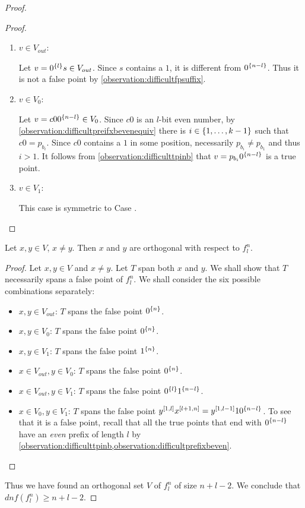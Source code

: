 \begin{proof}
\begin{proof}
\begin{enumerate}
\item $v \in V_{out}$:

Let $v = 0^{\{l\}} s \in V_{out}$.
Since $s$ contains a $1$,
it is different from $0^{\{n-l\}}$.
Thus it is not a false point
by \cref{observation:difficultfpsuffix}.

\item $v \in V_0$:
\label{item:difficultv0}

Let $v = c 0 0^{\{n-l\}} \in V_0$.
Since $c 0$ is an $l$-bit even number,
by \cref{observation:difficultpreifxbevenequiv}
there is $i \in \{1, \ldots, k-1\}$
such that $c 0 = p_{b_i}$.
Since $c0$ contains a $1$ in some position,
necessarily $p_{b_i} \neq p_{b_1}$ and thus $i > 1$.
It follows from \cref{observation:difficulttpinb}
that $v = p_{b_i} 0^{\{n-l\}}$ is a true point.

\item $v \in V_1$:

This case is symmetric to
Case .
\end{enumerate}
\end{proof}

\begin{claim}
Let $x, y \in V$, $x \neq y$.
Then $x$ and $y$ are orthogonal with respect to $f_l^n$.
\end{claim}

\begin{proof}
Let $x,y \in V$ and $x \neq y$.
Let $T$ span both $x$ and $y$.
We shall show that $T$ necessarily spans
a false point of $f_l^n$.
We shall consider the six possible combinations
separately:
\begin{itemize}
\item $x,y \in V_{out}$:
$T$ spans the false point $0^{\{n\}}$.
\item $x,y \in V_0$:
$T$ spans the false point $0^{\{n\}}$.
\item $x,y \in V_1$:
$T$ spans the false point $1^{\{n\}}$.
\item $x \in V_{out}, y \in V_0$:
$T$ spans the false point $0^{\{n\}}$.
\item $x \in V_{out}, y \in V_1$:
$T$ spans the false point $0^{\{l\}} 1^{\{n-l\}}$.
\item $x \in V_0, y \in V_1$:
$T$ spans the false point
$y^{[1, l]} x^{[l+1, n]}
= y^{[1, l-1]} 1 0^{\{n-l\}}$.
To see that it is a false point,
recall that
all the true points that end with $0^{\{n-l\}}$
have an \emph{even} prefix of length $l$
by \cref{observation:difficulttpinb,observation:difficultprefixbeven}.

\end{itemize}
\end{proof}

Thus we have found an orthogonal set $V$ of $f_l^n$
of size $n+l-2$.
We conclude that $dnf(f_l^n) \geq n+l-2$.
\end{proof}

